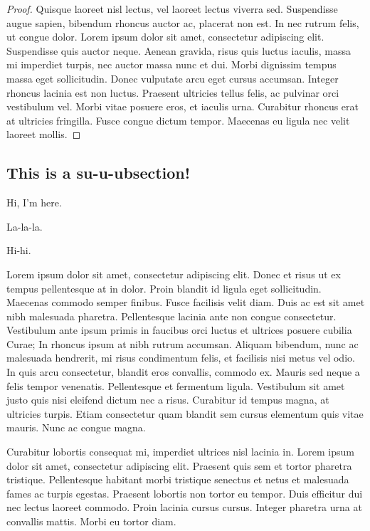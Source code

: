 \documentclass[notitlepage]{article}
\begin{document}
\begin{proof}
Quisque laoreet nisl lectus, vel laoreet lectus viverra sed. Suspendisse augue sapien, bibendum rhoncus auctor ac, placerat non est. In nec rutrum felis, ut congue dolor. Lorem ipsum dolor sit amet, consectetur adipiscing elit. Suspendisse quis auctor neque. Aenean gravida, risus quis luctus iaculis, massa mi imperdiet turpis, nec auctor massa nunc et dui. Morbi dignissim tempus massa eget sollicitudin. Donec vulputate arcu eget cursus accumsan. Integer rhoncus lacinia est non luctus. Praesent ultricies tellus felis, ac pulvinar orci vestibulum vel. Morbi vitae posuere eros, et iaculis urna. Curabitur rhoncus erat at ultricies fringilla. Fusce congue dictum tempor. Maecenas eu ligula nec velit laoreet mollis. 

        \end{proof}
        \subsection{This is a su-u-ubsection!}
        Hi, I'm here.

        La-la-la.

        Hi-hi.



Lorem ipsum dolor sit amet, consectetur adipiscing elit. Donec et risus ut ex tempus pellentesque at in dolor. Proin blandit id ligula eget sollicitudin. Maecenas commodo semper finibus. Fusce facilisis velit diam. Duis ac est sit amet nibh malesuada pharetra. Pellentesque lacinia ante non congue consectetur. Vestibulum ante ipsum primis in faucibus orci luctus et ultrices posuere cubilia Curae; In rhoncus ipsum at nibh rutrum accumsan. Aliquam bibendum, nunc ac malesuada hendrerit, mi risus condimentum felis, et facilisis nisi metus vel odio. In quis arcu consectetur, blandit eros convallis, commodo ex. Mauris sed neque a felis tempor venenatis. Pellentesque et fermentum ligula. Vestibulum sit amet justo quis nisi eleifend dictum nec a risus. Curabitur id tempus magna, at ultricies turpis. Etiam consectetur quam blandit sem cursus elementum quis vitae mauris. Nunc ac congue magna.

Curabitur lobortis consequat mi, imperdiet ultrices nisl lacinia in. Lorem ipsum dolor sit amet, consectetur adipiscing elit. Praesent quis sem et tortor pharetra tristique. Pellentesque habitant morbi tristique senectus et netus et malesuada fames ac turpis egestas. Praesent lobortis non tortor eu tempor. Duis efficitur dui nec lectus laoreet commodo. Proin lacinia cursus cursus. Integer pharetra urna at convallis mattis. Morbi eu tortor diam.
\end{document}
